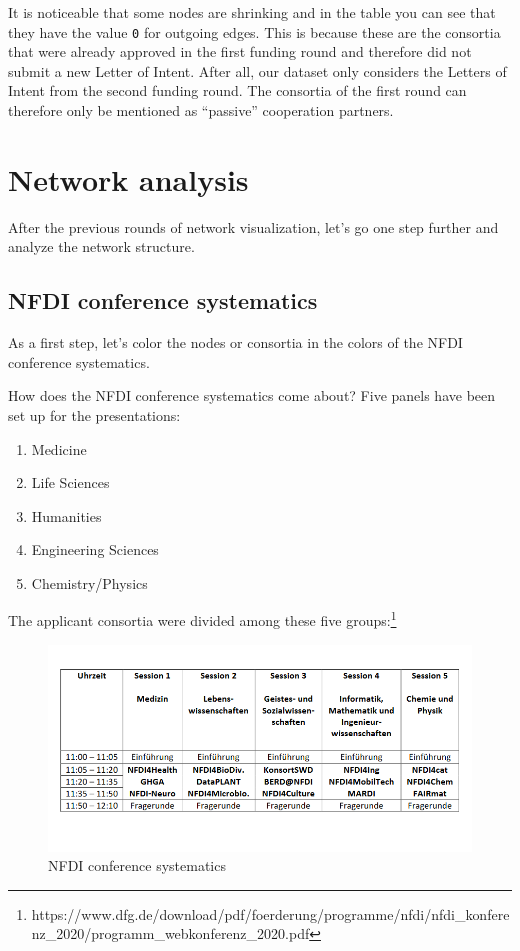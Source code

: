 \documentclass[11pt]{article}
\providecommand{\tightlist}{%
      \setlength{\itemsep}{0pt}\setlength{\parskip}{0pt}}
\begin{document}
    It is noticeable that some nodes are shrinking and in the table you can
see that they have the value \texttt{0} for outgoing edges. This is
because these are the consortia that were already approved in the first
funding round and therefore did not submit a new Letter of Intent. After
all, our dataset only considers the Letters of Intent from the second
funding round. The consortia of the first round can therefore only be
mentioned as ``passive'' cooperation partners.

    \hypertarget{network-analysis}{%
\section{Network analysis}\label{network-analysis}}

After the previous rounds of network visualization, let's go one step
further and analyze the network structure.

\hypertarget{nfdi-conference-systematics}{%
\subsection{NFDI conference
systematics}\label{nfdi-conference-systematics}}

As a first step, let's color the nodes or consortia in the colors of the
NFDI conference systematics.

How does the NFDI conference systematics come about? Five panels have
been set up for the presentations:

\begin{enumerate}
\def\labelenumi{\arabic{enumi}.}
\tightlist
\item
  Medicine
\item
  Life Sciences
\item
  Humanities
\item
  Engineering Sciences
\item
  Chemistry/Physics
\end{enumerate}

    The applicant consortia were divided among these five groups:\footnote{https://www.dfg.de/download/pdf/foerderung/programme/nfdi/nfdi\_konferenz\_2020/programm\_webkonferenz\_2020.pdf}

\begin{figure}
\centering
\includegraphics{img/nfdi-konferenzsystematik.png}
\caption{NFDI conference systematics}
\end{figure}
\end{document}
